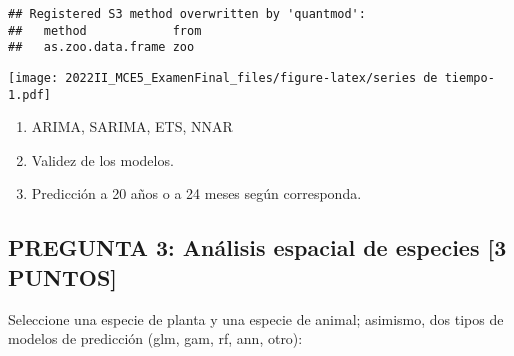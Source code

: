 \documentclass[
]{article}
\newenvironment{Shaded}{\begin{snugshade}}{\end{snugshade}}
\newcommand{\AttributeTok}[1]{\textcolor[rgb]{0.13,0.29,0.53}{#1}}
\newcommand{\CommentTok}[1]{\textcolor[rgb]{0.56,0.35,0.01}{\textit{#1}}}
\newcommand{\DecValTok}[1]{\textcolor[rgb]{0.00,0.00,0.81}{#1}}
\newcommand{\DocumentationTok}[1]{\textcolor[rgb]{0.56,0.35,0.01}{\textbf{\textit{#1}}}}
\newcommand{\FunctionTok}[1]{\textcolor[rgb]{0.13,0.29,0.53}{\textbf{#1}}}
\newcommand{\NormalTok}[1]{#1}
\newcommand{\OtherTok}[1]{\textcolor[rgb]{0.56,0.35,0.01}{#1}}
\newcommand{\SpecialCharTok}[1]{\textcolor[rgb]{0.81,0.36,0.00}{\textbf{#1}}}
\newcommand{\StringTok}[1]{\textcolor[rgb]{0.31,0.60,0.02}{#1}}
\begin{document}
\begin{verbatim}
## Registered S3 method overwritten by 'quantmod':
##   method            from
##   as.zoo.data.frame zoo
\end{verbatim}

\begin{Shaded}
\end{Shaded}

\texttt{[image: 2022II\_MCE5\_ExamenFinal\_files/figure-latex/series de tiempo-1.pdf]}

\begin{enumerate}
\def\labelenumi{\arabic{enumi}.}
\setcounter{enumi}{1}
\item
  ARIMA, SARIMA, ETS, NNAR
\item
  Validez de los modelos.
\item
  Predicción a 20 años o a 24 meses según corresponda.
\end{enumerate}

\hypertarget{pregunta-3-anuxe1lisis-espacial-de-especies-3-puntos}{%
\subsection{\texorpdfstring{\textbf{PREGUNTA 3: Análisis espacial de
especies {[}3
PUNTOS{]}}}{PREGUNTA 3: Análisis espacial de especies {[}3 PUNTOS{]}}}\label{pregunta-3-anuxe1lisis-espacial-de-especies-3-puntos}}

Seleccione una especie de planta y una especie de animal; asimismo, dos
tipos de modelos de predicción (glm, gam, rf, ann, otro):
\end{document}
